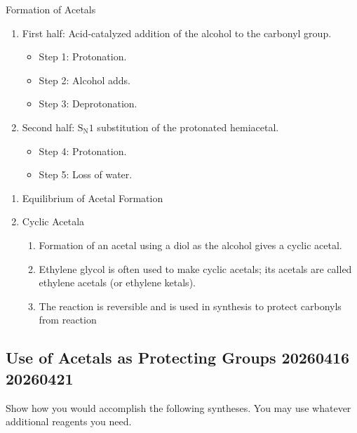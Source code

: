 \begin{mechanism}
    Formation of Acetals
    \begin{enumerate}
        \item First half: Acid-catalyzed addition of the alcohol to the carbonyl group.
        \begin{itemize}
            \item Step 1: Protonation.
            \item Step 2: Alcohol adds.
            \item Step 3: Deprotonation.
        \end{itemize}
        \item Second half: $\mathrm{S_N}1$ substitution of the protonated hemiacetal.
        \begin{itemize}
            \item Step 4: Protonation.
            \item Step 5: Loss of water.
        \end{itemize}
    \end{enumerate}
\end{mechanism}

\begin{enumerate}[resume]
    \item Equilibrium of Acetal Formation
    \item Cyclic Acetala
    \begin{enumerate}
        \item Formation of an acetal using a diol as the alcohol gives a cyclic acetal.
        \item Ethylene glycol is often used to make cyclic acetals; its acetals are called ethylene acetals (or ethylene ketals).
        \item The reaction is reversible and is used in synthesis to protect carbonyls from reaction
    \end{enumerate}
\end{enumerate}

\subsection{Use of Acetals as Protecting Groups 20260416 20260421}

\begin{example} %
    Show how you would accomplish the following syntheses. You may use whatever additional reagents you need.
\end{example}

